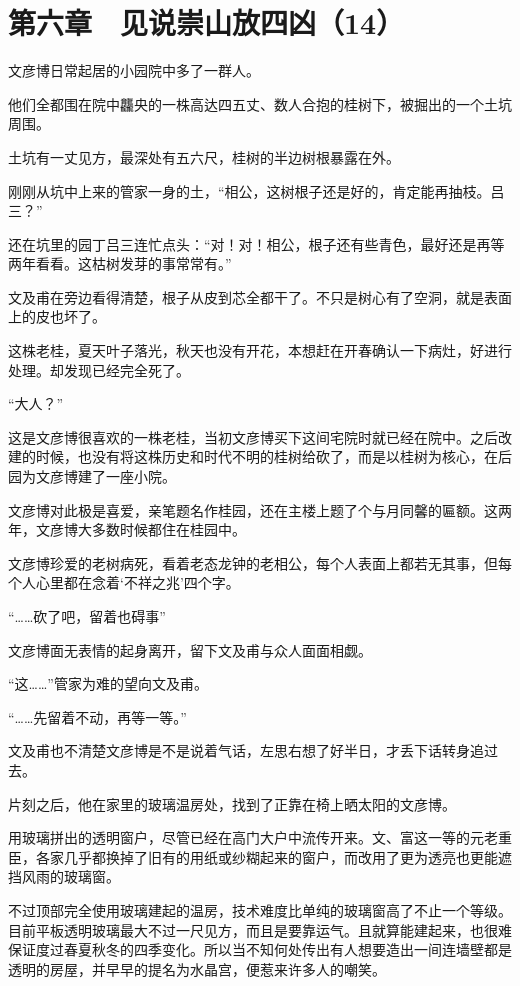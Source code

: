 \section{第六章　见说崇山放四凶（14）}

文彦博日常起居的小园院中多了一群人。

他们全都围在院中龘央的一株高达四五丈、数人合抱的桂树下，被掘出的一个土坑周围。

土坑有一丈见方，最深处有五六尺，桂树的半边树根暴露在外。

刚刚从坑中上来的管家一身的土，“相公，这树根子还是好的，肯定能再抽枝。吕三？”

还在坑里的园丁吕三连忙点头：“对！对！相公，根子还有些青色，最好还是再等两年看看。这枯树发芽的事常常有。”

文及甫在旁边看得清楚，根子从皮到芯全都干了。不只是树心有了空洞，就是表面上的皮也坏了。

这株老桂，夏天叶子落光，秋天也没有开花，本想赶在开春确认一下病灶，好进行处理。却发现已经完全死了。

“大人？”

这是文彦博很喜欢的一株老桂，当初文彦博买下这间宅院时就已经在院中。之后改建的时候，也没有将这株历史和时代不明的桂树给砍了，而是以桂树为核心，在后园为文彦博建了一座小院。

文彦博对此极是喜爱，亲笔题名作桂园，还在主楼上题了个与月同馨的匾额。这两年，文彦博大多数时候都住在桂园中。

文彦博珍爱的老树病死，看着老态龙钟的老相公，每个人表面上都若无其事，但每个人心里都在念着‘不祥之兆’四个字。

“……砍了吧，留着也碍事”

文彦博面无表情的起身离开，留下文及甫与众人面面相觑。

“这……”管家为难的望向文及甫。

“……先留着不动，再等一等。”

文及甫也不清楚文彦博是不是说着气话，左思右想了好半日，才丢下话转身追过去。

片刻之后，他在家里的玻璃温房处，找到了正靠在椅上晒太阳的文彦博。

用玻璃拼出的透明窗户，尽管已经在高门大户中流传开来。文、富这一等的元老重臣，各家几乎都换掉了旧有的用纸或纱糊起来的窗户，而改用了更为透亮也更能遮挡风雨的玻璃窗。

不过顶部完全使用玻璃建起的温房，技术难度比单纯的玻璃窗高了不止一个等级。目前平板透明玻璃最大不过一尺见方，而且是要靠运气。且就算能建起来，也很难保证度过春夏秋冬的四季变化。所以当不知何处传出有人想要造出一间连墙壁都是透明的房屋，并早早的提名为水晶宫，便惹来许多人的嘲笑。

